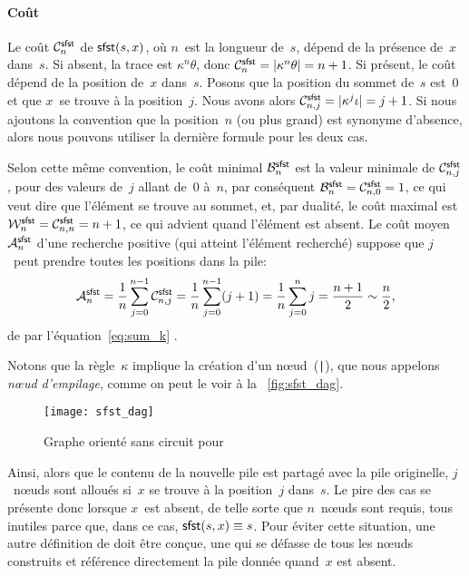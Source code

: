 \paragraph{Coût}

Le coût \(\C{\fun{sfst}}{n}\) de
\(\fun{sfst}(s,x)\), où \(n\)~est la longueur de~\(s\), dépend de la
présence de~\(x\) dans~\(s\). Si absent, la trace est
\(\kappa^n\theta\), donc \(\C{\fun{sfst}}{n} = \len{\kappa^n\theta} =
n + 1\). Si présent, le coût dépend de la position de~\(x\)
dans~\(s\). Posons que la position du sommet de~\(s\) est~\(0\) et que
\(x\)~se trouve à la position~\(j\). Nous avons alors
\(\C{\fun{sfst}}{n,j} = \len{\kappa^j\iota} = j +
1\). Si nous ajoutons la convention
que la position~\(n\) (ou plus grand) est synonyme d'absence, alors
nous pouvons utiliser la dernière formule pour les deux cas.

Selon cette même convention, le coût minimal
\(\B{\fun{sfst}}{n}\) est la valeur
minimale de \(\C{\fun{sfst}}{n,j}\),
pour des valeurs de~\(j\) allant de~\(0\) à~\(n\), par conséquent
\(\B{\fun{sfst}}{n} = \C{\fun{sfst}}{n,0} = 1\), ce qui veut dire que
l'élément se trouve au sommet, et, par dualité, le coût
maximal
est \(\W{\fun{sfst}}{n} =
\C{\fun{sfst}}{n,n} = n + 1\), ce qui advient quand l'élément est
absent. Le coût moyen
\(\M{\fun{sfst}}{n}\) d'une recherche positive (qui atteint l'élément recherché)
suppose que \(j\)~peut prendre toutes les positions dans la pile:
\begin{equation*}
  \M{\fun{sfst}}{n} = \frac{1}{n}\sum_{j=0}^{n-1}\C{\fun{sfst}}{n,j} =
  \frac{1}{n}\sum_{j=0}^{n-1}(j+1) = \frac{1}{n}\sum_{j=0}^{n}j
  = \frac{n+1}{2} \sim \frac{n}{2},
\end{equation*}
de par l'équation~\eqref{eq:sum_k} .

Notons que la règle~\(\kappa\) implique la création d'un
nœud~(\texttt{|}), que nous appelons \emph{nœud
  d'empilage}, comme on peut le voir à la
\fig~\vref{fig:sfst_dag}.
\begin{figure}[b]
\centering
\texttt{[image: sfst\_dag]}
\caption{Graphe orienté sans circuit pour }
\label{fig:sfst_dag}
\end{figure}
Ainsi, alors que le contenu de la nouvelle pile est partagé avec la
pile originelle, \(j\)~nœuds sont alloués si~\(x\) se trouve à la
position~\(j\) dans~\(s\). Le pire des cas se présente donc lorsque
\(x\)~est absent, de telle sorte que \(n\)~nœuds sont requis, tous
inutiles parce que, dans ce cas, \(\fun{sfst}(s,x) \equiv s\). Pour
éviter cette situation, une autre définition de  doit être
conçue, une qui se défasse de tous les nœuds construits et
référence directement la pile donnée quand~\(x\) est absent.

